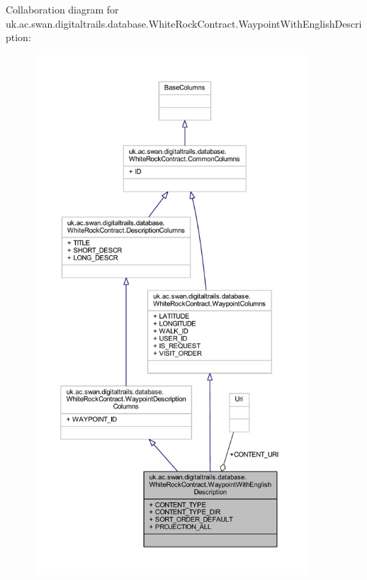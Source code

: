 Collaboration diagram for uk.\+ac.\+swan.\+digitaltrails.\+database.\+White\+Rock\+Contract.\+Waypoint\+With\+English\+Description\+:
\nopagebreak
\begin{figure}[H]
\begin{center}
\leavevmode
\includegraphics[height=550pt]{classuk_1_1ac_1_1swan_1_1digitaltrails_1_1database_1_1_white_rock_contract_1_1_waypoint_with_english_description__coll__graph}
\end{center}
\end{figure}
